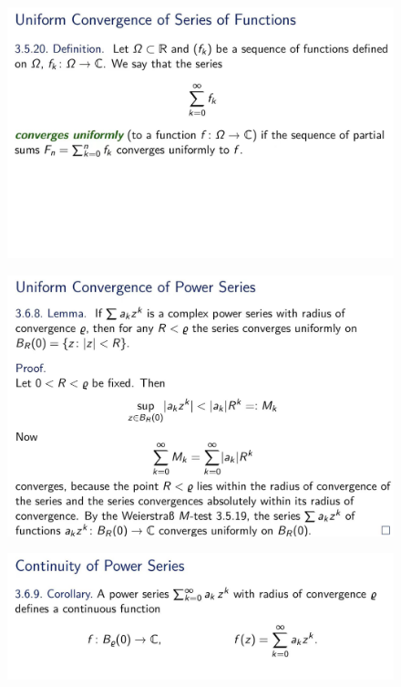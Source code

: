 \documentclass{beamer}
\begin{document}
\begin{frame}
    \begin{figure}[htbp]
        \centering
        \includegraphics[width=12cm]{uniform_converge.jpg}
    \end{figure}
\end{frame}

\begin{frame}
    \begin{figure}[htbp]
        \centering
        \includegraphics[width=12cm]{uniform_converge2.jpg}
    \end{figure}
\end{frame}

\begin{frame}
    \begin{figure}[htbp]
        \centering
        \includegraphics[width=12cm]{continuity.jpg}
    \end{figure}
\end{frame}
\end{document}
